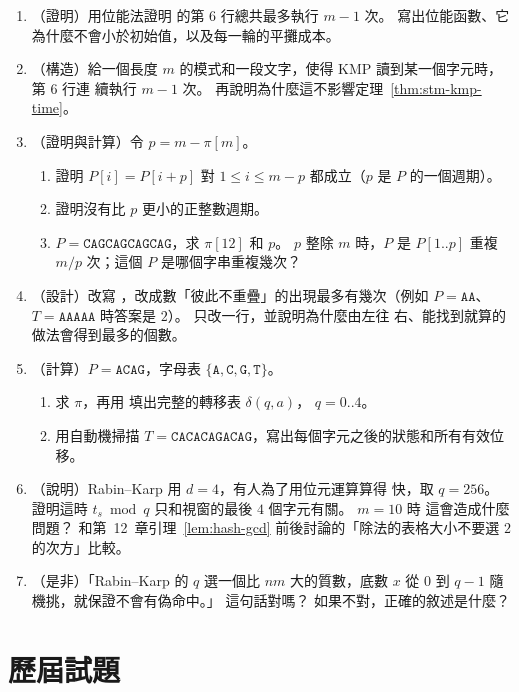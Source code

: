 \begin{enumerate}
\item （證明）用位能法證明  的第 6 行總共最多執行 $m - 1$ 次。
寫出位能函數、它為什麼不會小於初始值，以及每一輪的平攤成本。

\item （構造）給一個長度 $m$ 的模式和一段文字，使得 KMP 讀到某一個字元時，第 6 行連
續執行 $m - 1$ 次。 再說明為什麼這不影響定理~\ref{thm:stm-kmp-time}。

\item \label{q:stm-period}（證明與計算）令 $p = m - \pi[m]$。
\begin{enumerate}
\item 證明 $P[i] = P[i + p]$ 對 $1 \le i \le m - p$ 都成立（$p$ 是 $P$ 的一個週期）。
\item 證明沒有比 $p$ 更小的正整數週期。
\item $P = \mathtt{CAGCAGCAGCAG}$，求 $\pi[12]$ 和 $p$。 $p$ 整除 $m$ 時，$P$ 是
$P[1..p]$ 重複 $m/p$ 次；這個 $P$ 是哪個字串重複幾次？
\end{enumerate}

\item （設計）改寫 ，改成數「彼此不重疊」的出現最多有幾次（例如
$P = \mathtt{AA}$、$T = \mathtt{AAAAA}$ 時答案是 $2$）。 只改一行，並說明為什麼由左往
右、能找到就算的做法會得到最多的個數。

\item （計算）$P = \mathtt{ACAG}$，字母表 $\{\mathtt{A}, \mathtt{C}, \mathtt{G},
\mathtt{T}\}$。
\begin{enumerate}
\item 求 $\pi$，再用  填出完整的轉移表 $\delta(q, a)$，
$q = 0..4$。
\item 用自動機掃描 $T = \mathtt{CACACAGACAG}$，寫出每個字元之後的狀態和所有有效位
移。
\end{enumerate}

\item \label{q:stm-power-mod}（說明）Rabin--Karp 用 $d = 4$，有人為了用位元運算算得
快，取 $q = 256$。 證明這時 $t_s \bmod q$ 只和視窗的最後 $4$ 個字元有關。 $m = 10$ 時
這會造成什麼問題？ 和第~12~章引理~\ref{lem:hash-gcd} 前後討論的「除法的表格大小不要選
$2$ 的次方」比較。

\item （是非）「Rabin--Karp 的 $q$ 選一個比 $nm$ 大的質數，底數 $x$ 從 $0$ 到 $q - 1$
隨機挑，就保證不會有偽命中。」 這句話對嗎？ 如果不對，正確的敘述是什麼？
\end{enumerate}

\section{歷屆試題}
\label{sec:stm-pastexam}

